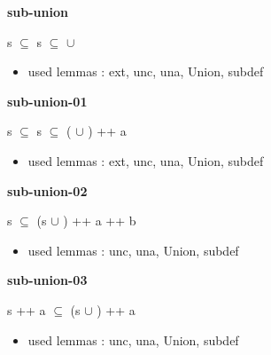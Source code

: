 \documentclass[a4paper]{article}
\begin{document}
\medskip

\bigskip

{\large\bf sub-union}

\medskip

 \Fol s $\subseteq$  \Imp s $\subseteq$  $\cup$ 

\begin{itemize}


\item       used lemmas  : ext, unc, una, Union, subdef

\end{itemize}

\medskip

\bigskip

{\large\bf sub-union-01}

\medskip

 \Fol s $\subseteq$  \Imp s $\subseteq$ ( $\cup$ ) ++ a

\begin{itemize}


\item       used lemmas  : ext, unc, una, Union, subdef

\end{itemize}

\medskip

\bigskip

{\large\bf sub-union-02}

\medskip

 \Fol s $\subseteq$ (s $\cup$ ) ++ a ++ b

\begin{itemize}


\item       used lemmas  : unc, una, Union, subdef

\end{itemize}

\medskip

\bigskip

{\large\bf sub-union-03}

\medskip

 \Fol s ++ a $\subseteq$ (s $\cup$ ) ++ a

\begin{itemize}


\item       used lemmas  : unc, una, Union, subdef

\end{itemize}
\end{document}
